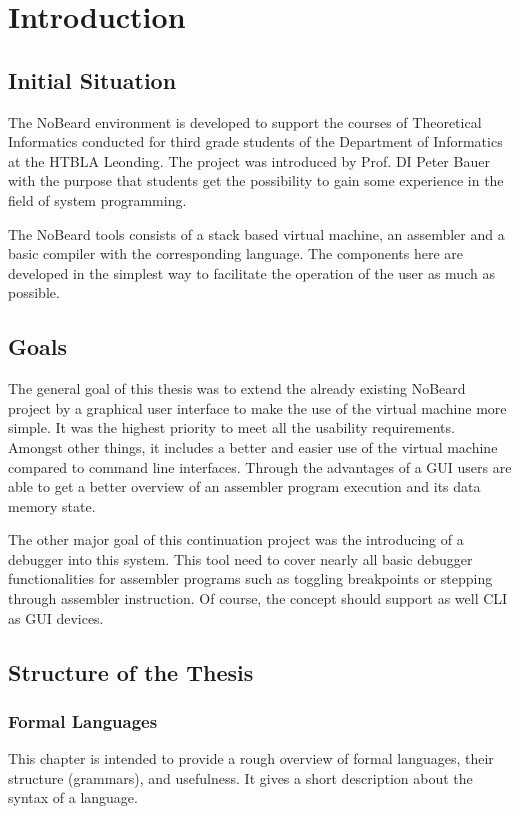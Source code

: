 \chapter{Introduction}
\section{Initial Situation}
The NoBeard environment is developed to support the courses of Theoretical Informatics conducted for third grade students of the Department of Informatics at the HTBLA Leonding. The project was introduced by Prof. DI Peter Bauer with the purpose that students get the possibility to gain some experience in the field of system programming. 

The NoBeard tools consists of a stack based virtual machine, an assembler and a basic compiler with the corresponding language. The components here are developed in the simplest way  to facilitate the operation of the user as much as possible.

\section{Goals}
The general goal of this thesis was to extend the already existing NoBeard project by a graphical user interface to make the use of the virtual machine more simple. It was the highest priority to meet all the usability requirements. Amongst other things, it includes a better and easier use of the virtual machine compared to command line interfaces. Through the advantages of a GUI users are able to get a better overview of an assembler program execution and its data memory state.

The other major goal of this continuation project was the introducing of a debugger into this system. This tool need to cover nearly all basic debugger functionalities for assembler programs such as toggling breakpoints or stepping through assembler instruction. Of course, the concept should support as well CLI as GUI devices.

\section{Structure of the Thesis}
\subsection{Formal Languages}
This chapter is intended to provide a rough overview of formal languages, their structure (grammars), and usefulness. It gives a short description about the syntax of a language.
